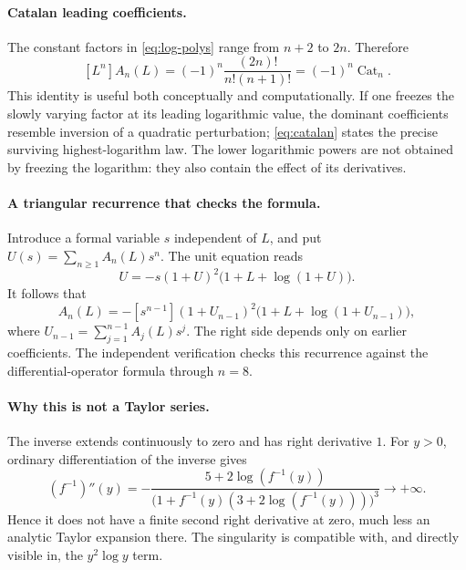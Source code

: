 \documentclass[11pt,a4paper]{article}
\numberwithin{equation}{section}
\theoremstyle{definition}
\begin{document}
\paragraph{Catalan leading coefficients.}
The constant factors in \eqref{eq:log-polys} range from $n+2$ to $2n$.
Therefore
\begin{equation}\label{eq:catalan}
 [L^n]A_n(L)=(-1)^n\frac{(2n)!}{n!(n+1)!}
            =(-1)^n\operatorname{Cat}_n.
\end{equation}
This identity is useful both conceptually and computationally. If one
freezes the slowly varying factor at its leading logarithmic value,
the dominant coefficients resemble inversion of a quadratic perturbation;
\eqref{eq:catalan} states the precise surviving highest-logarithm law.
The lower logarithmic powers are not obtained by freezing the logarithm:
they also contain the effect of its derivatives.

\paragraph{A triangular recurrence that checks the formula.}
Introduce a formal variable $s$ independent of $L$, and put
$U(s)=\sum_{n\ge1}A_n(L)s^n$. The unit equation reads
\begin{equation}\label{eq:log-recursion}
 U=-s(1+U)^2\bigl(1+L+\log(1+U)\bigr).
\end{equation}
It follows that
\[
 A_n(L)=-[s^{n-1}](1+U_{n-1})^2
               \bigl(1+L+\log(1+U_{n-1})\bigr),
\]
where $U_{n-1}=\sum_{j=1}^{n-1}A_j(L)s^j$.
The right side depends only on earlier coefficients. The independent
verification checks this recurrence against the differential-operator
formula through $n=8$.

\paragraph{Why this is not a Taylor series.}
The inverse extends continuously to zero and has right derivative $1$.
For $y>0$, ordinary differentiation of the inverse gives
\begin{equation}
 (f^{-1})''(y)=
 -\frac{5+2\log(f^{-1}(y))}
 {\bigl(1+f^{-1}(y)(3+2\log(f^{-1}(y)))\bigr)^3}
 \longrightarrow+\infty.
\end{equation}
Hence it does not have a finite second right derivative at zero, much
less an analytic Taylor expansion there. The singularity is compatible
with, and directly visible in, the $y^2\log y$ term.
\end{document}
